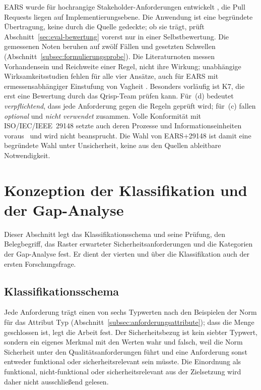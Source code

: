 \documentclass[11pt,a4paper]{report}
\begin{document}
EARS wurde für hochrangige Stakeholder-Anforderungen entwickelt
\cite[Abschn.~2]{mavin2009ears}, die Pull Requests liegen auf
Implementierungsebene. Die Anwendung ist eine begründete Übertragung,
keine durch die Quelle gedeckte; ob sie trägt, prüft
Abschnitt~\ref{sec:eval-bewertung} vorerst nur in einer
Selbstbewertung. Die gemessenen Noten beruhen auf zwölf Fällen und
gesetzten Schwellen (Abschnitt~\ref{subsec:formulierungsprobe}). Die
Literaturnoten messen Vorhandensein und Reichweite einer Regel, nicht
ihre Wirkung; unabhängige Wirksamkeitsstudien fehlen für alle vier
Ansätze, auch für EARS mit ermessensabhängiger Einstufung von Vagheit
\cite[Abschn.~6]{mavin2009ears}. Besonders vorläufig ist
K7, die erst eine Bewertung durch das Qrisp-Team prüfen kann. Für~(d)
bedeutet \emph{verpflichtend}, dass jede Anforderung gegen die Regeln
geprüft wird; für~(c) fallen \emph{optional} und \emph{nicht verwendet}
zusammen. Volle Konformität mit ISO/IEC/IEEE~29148 setzte auch deren
Prozesse und Informationseinheiten voraus~\cite[Abschn.~4.2]{iso29148}
und wird nicht beansprucht. Die Wahl von EARS+29148 ist damit eine
begründete Wahl unter Unsicherheit, keine aus den Quellen ableitbare
Notwendigkeit.

\section{Konzeption der Klassifikation und der Gap-Analyse}
\label{sec:konzeption-gap}

Dieser Abschnitt legt das Klassifikationsschema und seine Prüfung, den
Belegbegriff, das Raster erwarteter Sicherheitsanforderungen und die
Kategorien der Gap-Analyse fest. Er dient der vierten und über die
Klassifikation auch der ersten Forschungsfrage.

\subsection{Klassifikationsschema}
\label{subsec:klassifikationsschema}

Jede Anforderung trägt einen von sechs Typwerten nach den Beispielen
der Norm für das Attribut Typ
(Abschnitt~\ref{subsec:anforderungsattribute}); dass die Menge
geschlossen ist, legt die Arbeit fest. Der Sicherheitsbezug ist kein
siebter Typwert, sondern ein eigenes Merkmal mit den Werten wahr und
falsch, weil die Norm Sicherheit unter den Qualitätsanforderungen führt
\cite[Abschn.~5.2.8.3]{iso29148} und eine Anforderung sonst entweder
funktional oder sicherheitsrelevant sein müsste. Die Einordnung als
funktional, nicht-funktional oder sicherheitsrelevant aus der
Zielsetzung wird daher nicht ausschließend gelesen.
\end{document}
